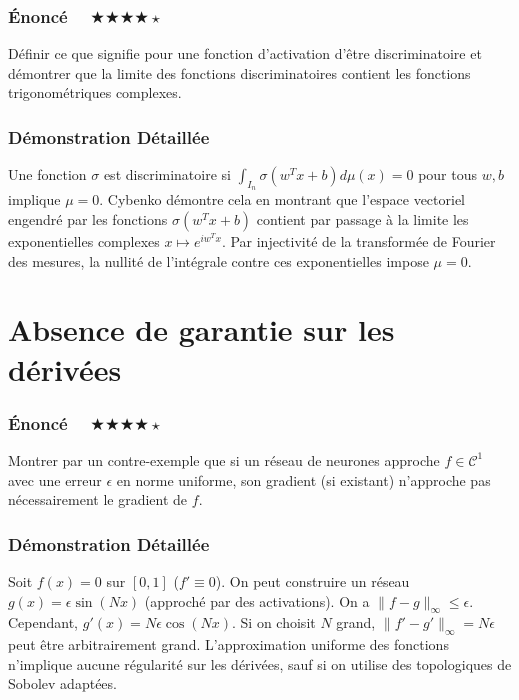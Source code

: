 \documentclass[11pt,a4paper]{article}
\begin{document}
\subsubsection{Énoncé $\quad \bigstar\bigstar\bigstar\bigstar\star$}

Définir ce que signifie pour une fonction d'activation d'être discriminatoire et démontrer que la limite des fonctions discriminatoires contient les fonctions trigonométriques complexes.

\subsubsection{Démonstration Détaillée}

Une fonction $\sigma$ est discriminatoire si $\int_{I_n} \sigma(w^T x + b) d\mu(x) = 0$ pour tous $w,b$ implique $\mu=0$. Cybenko démontre cela en montrant que l'espace vectoriel engendré par les fonctions $\sigma(w^T x + b)$ contient par passage à la limite les exponentielles complexes $x \mapsto e^{i w^T x}$. Par injectivité de la transformée de Fourier des mesures, la nullité de l'intégrale contre ces exponentielles impose $\mu = 0$.


\section{Absence de garantie sur les dérivées}

\subsubsection{Énoncé $\quad \bigstar\bigstar\bigstar\bigstar\star$}

Montrer par un contre-exemple que si un réseau de neurones approche $f \in \mathcal{C}^1$ avec une erreur $\epsilon$ en norme uniforme, son gradient (si existant) n'approche pas nécessairement le gradient de $f$.

\subsubsection{Démonstration Détaillée}

Soit $f(x) = 0$ sur $[0,1]$ ($f' \equiv 0$). On peut construire un réseau $g(x) = \epsilon \sin(Nx)$ (approché par des activations). On a $\|f - g\|_\infty \le \epsilon$. Cependant, $g'(x) = N\epsilon \cos(Nx)$. Si on choisit $N$ grand, $\|f' - g'\|_\infty = N\epsilon$ peut être arbitrairement grand. L'approximation uniforme des fonctions n'implique aucune régularité sur les dérivées, sauf si on utilise des topologiques de Sobolev adaptées.
\end{document}
